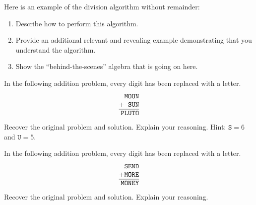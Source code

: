 \documentclass[nooutcomes]{ximera}
\begin{document}
\begin{problem}Here is an example of the division algorithm without remainder:
\begin{image}
\end{image}
\begin{enumerate}
\item Describe how to perform this algorithm.
\item Provide an additional relevant and revealing example
  demonstrating that you understand the algorithm.
\item Show the ``behind-the-scenes'' algebra that is going on here.
\end{enumerate}
\end{problem} 

\begin{problem}In the following addition problem, every digit has been
  replaced with a letter.
\[
\begin{tabular}{@{}r@{}}
\texttt{MOON}\\
$+$\texttt{ SUN}\\ \hline
\texttt{PLUTO}
\end{tabular}
\]
Recover the original problem and solution. Explain your reasoning.
Hint: $\texttt{S}=6$ and $\texttt{U}=5$.
\end{problem} 

\begin{problem}In the following addition problem, every digit has been
  replaced with a letter.
\[
\begin{tabular}{@{}r@{}}
\texttt{SEND}\\
$+$\texttt{MORE}\\ \hline
\texttt{MONEY}
\end{tabular}
\]
Recover the original problem and solution. Explain your reasoning.
\end{problem} 
\end{document}
